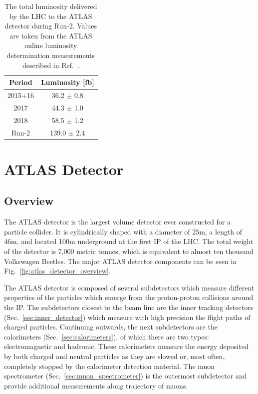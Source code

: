 \begin{table}
\centering
\begin{tabular}{|c|c|} 
\hline
Period & Luminosity [fb] \\
\hline\hline
2015+16 & 36.2 $\pm$ 0.8 \\ 
\hline
2017 & 44.3 $\pm$ 1.0 \\
\hline
2018 & 58.5 $\pm$ 1.2 \\
\hline\hline
Run-2 & 139.0 $\pm$ 2.4 \\
\hline
\end{tabular}
\caption{
    The total luminosity delivered by the LHC to the ATLAS detector during Run-2.
    Values are taken from the ATLAS online luminosity determination measurements described in Ref.~\cite{ATLAS-CONF-2019-021}.
}
\label{tab:lumi_vs_period}
\end{table}

\section{ATLAS Detector}

\subsection{Overview}
The ATLAS detector is the largest volume detector ever constructed for a particle collider.
It is cylindrically shaped with a diameter of 25m, a length of 46m, and located 100m underground at the first IP of the LHC.
The total weight of the detector is 7,000 metric tonnes, which is equivalent to almost ten thousand Volkswagen Beetles.
The major ATLAS detector components can be seen in Fig.~\ref{fig:atlas_detector_overview}.

The ATLAS detector is composed of several subdetectors which measure different properties of the particles which emerge from the proton-proton collisions around the IP.
The subdetectors closest to the beam line are the inner tracking detectors (Sec.~\ref{sec:inner_detector}) which measure with high precision the flight paths of charged particles.
Continuing outwards, the next subdetectors are the calorimeters (Sec.~\ref{sec:calorimeters}), of which there are two types: electromagnetic and hadronic.
These calorimeters measure the energy deposited by both charged and neutral particles as they are slowed or, most often, completely stopped by the calorimeter detection material.
The muon spectrometer (Sec.~\ref{sec:muon_spectrometer}) is the outermost subdetector and provide additional measurements along trajectory of muons.

